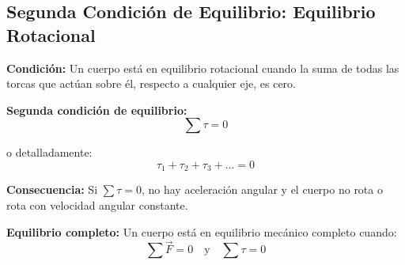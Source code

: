 \begin{center}
\shorthandoff{>}\shorthandoff{<}
\shorthandon{>}\shorthandon{<}
\end{center}

\newpage
\subsection{Segunda Condición de Equilibrio: Equilibrio Rotacional}

\begin{seccion}
\begin{definicion}
    \textbf{Condición:} Un cuerpo está en equilibrio rotacional cuando la suma de todas las torcas que actúan sobre él, respecto a cualquier eje, es cero.
\end{definicion}

\begin{ecuacion}
\textbf{Segunda condición de equilibrio:}
$$\sum \tau = 0$$

o detalladamente:
$$\tau_1 + \tau_2 + \tau_3 + ... = 0$$
\end{ecuacion}

\textbf{Consecuencia:} Si $\sum \tau = 0$, no hay aceleración angular y el cuerpo no rota o rota con velocidad angular constante.

\begin{definicion}
    \textbf{Equilibrio completo:} Un cuerpo está en equilibrio mecánico completo cuando:
$$\sum \vec{F} = 0 \quad \text{y} \quad \sum \tau = 0$$
\end{definicion}

\end{seccion}

